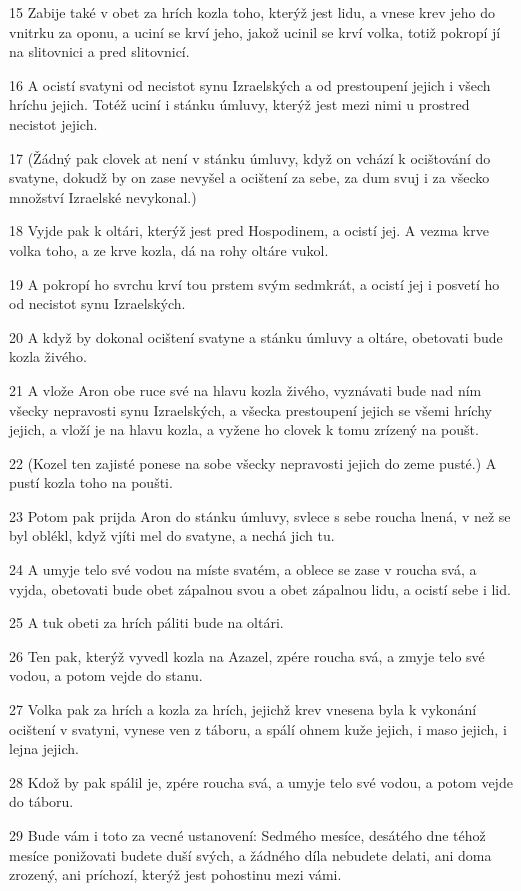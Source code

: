 \par 15 Zabije také v obet za hrích kozla toho, kterýž jest lidu, a vnese krev jeho do vnitrku za oponu, a uciní se krví jeho, jakož ucinil se krví volka, totiž pokropí jí na slitovnici a pred slitovnicí.
\par 16 A ocistí svatyni od necistot synu Izraelských a od prestoupení jejich i všech hríchu jejich. Totéž uciní i stánku úmluvy, kterýž jest mezi nimi u prostred necistot jejich.
\par 17 (Žádný pak clovek at není v stánku úmluvy, když on vchází k ocištování do svatyne, dokudž by on zase nevyšel a ocištení za sebe, za dum svuj i za všecko množství Izraelské nevykonal.)
\par 18 Vyjde pak k oltári, kterýž jest pred Hospodinem, a ocistí jej. A vezma krve volka toho, a ze krve kozla, dá na rohy oltáre vukol.
\par 19 A pokropí ho svrchu krví tou prstem svým sedmkrát, a ocistí jej i posvetí ho od necistot synu Izraelských.
\par 20 A když by dokonal ocištení svatyne a stánku úmluvy a oltáre, obetovati bude kozla živého.
\par 21 A vlože Aron obe ruce své na hlavu kozla živého, vyznávati bude nad ním všecky nepravosti synu Izraelských, a všecka prestoupení jejich se všemi hríchy jejich, a vloží je na hlavu kozla, a vyžene ho clovek k tomu zrízený na poušt.
\par 22 (Kozel ten zajisté ponese na sobe všecky nepravosti jejich do zeme pusté.) A pustí kozla toho na poušti.
\par 23 Potom pak prijda Aron do stánku úmluvy, svlece s sebe roucha lnená, v než se byl oblékl, když vjíti mel do svatyne, a nechá jich tu.
\par 24 A umyje telo své vodou na míste svatém, a oblece se zase v roucha svá, a vyjda, obetovati bude obet zápalnou svou a obet zápalnou lidu, a ocistí sebe i lid.
\par 25 A tuk obeti za hrích páliti bude na oltári.
\par 26 Ten pak, kterýž vyvedl kozla na Azazel, zpére roucha svá, a zmyje telo své vodou, a potom vejde do stanu.
\par 27 Volka pak za hrích a kozla za hrích, jejichž krev vnesena byla k vykonání ocištení v svatyni, vynese ven z táboru, a spálí ohnem kuže jejich, i maso jejich, i lejna jejich.
\par 28 Kdož by pak spálil je, zpére roucha svá, a umyje telo své vodou, a potom vejde do táboru.
\par 29 Bude vám i toto za vecné ustanovení: Sedmého mesíce, desátého dne téhož mesíce ponižovati budete duší svých, a žádného díla nebudete delati, ani doma zrozený, ani príchozí, kterýž jest pohostinu mezi vámi.
